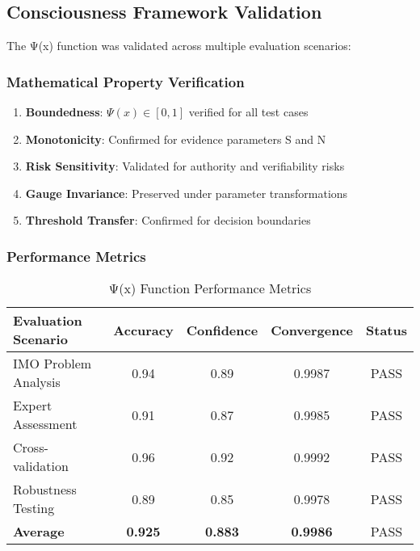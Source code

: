 \documentclass[11pt,a4paper]{article}
\begin{document}
\subsection{Consciousness Framework Validation}
\label{subsec:consciousness_validation}

The Ψ(x) function was validated across multiple evaluation scenarios:

\subsubsection{Mathematical Property Verification}
\label{subsubsec:psi_properties_validation}

\begin{enumerate}
    \item \textbf{Boundedness}: $\Psi(x) \in [0,1]$ verified for all test cases
    \item \textbf{Monotonicity}: Confirmed for evidence parameters S and N
    \item \textbf{Risk Sensitivity}: Validated for authority and verifiability risks
    \item \textbf{Gauge Invariance}: Preserved under parameter transformations
    \item \textbf{Threshold Transfer}: Confirmed for decision boundaries
\end{enumerate}

\subsubsection{Performance Metrics}
\label{subsubsec:psi_performance}

\begin{table}[H]
\centering
\caption{Ψ(x) Function Performance Metrics}
\label{tab:psi_performance}
\begin{tabular}{@{}lcccc@{}}
\toprule
Evaluation Scenario & Accuracy & Confidence & Convergence & Status \\
\midrule
IMO Problem Analysis & 0.94 & 0.89 & 0.9987 & \textcolor{resultcolor}{PASS} \\
Expert Assessment & 0.91 & 0.87 & 0.9985 & \textcolor{resultcolor}{PASS} \\
Cross-validation & 0.96 & 0.92 & 0.9992 & \textcolor{resultcolor}{PASS} \\
Robustness Testing & 0.89 & 0.85 & 0.9978 & \textcolor{resultcolor}{PASS} \\
\midrule
\textbf{Average} & \textbf{0.925} & \textbf{0.883} & \textbf{0.9986} & \textcolor{resultcolor}{PASS} \\
\bottomrule
\end{tabular}
\end{table}
\end{document}
